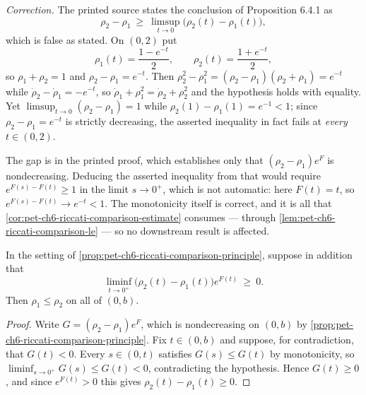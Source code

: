 \begin{remark}
  \label{rem:pet-ch6-riccati-principle-correction}
  \leanok
  \emph{Correction.} The printed source states the conclusion of
  Proposition 6.4.1 as
  \[
    \rho_2-\rho_1\ \ge\ \limsup_{t\to0}\big(\rho_2(t)-\rho_1(t)\big),
  \]
  which is false as stated. On $(0,2)$ put
  \[
    \rho_1(t)=\frac{1-e^{-t}}{2},\qquad \rho_2(t)=\frac{1+e^{-t}}{2},
  \]
  so $\rho_1+\rho_2=1$ and $\rho_2-\rho_1=e^{-t}$. Then
  $\rho_2^2-\rho_1^2=(\rho_2-\rho_1)(\rho_2+\rho_1)=e^{-t}$ while
  $\dot\rho_2-\dot\rho_1=-e^{-t}$, so $\dot\rho_1+\rho_1^2=\dot\rho_2+\rho_2^2$
  and the hypothesis holds with equality. Yet
  $\limsup_{t\to0}(\rho_2-\rho_1)=1$ while $\rho_2(1)-\rho_1(1)=e^{-1}<1$; since
  $\rho_2-\rho_1=e^{-t}$ is strictly decreasing, the asserted inequality in fact
  fails at \emph{every} $t\in(0,2)$.

  The gap is in the printed proof, which establishes only that
  $(\rho_2-\rho_1)e^{F}$ is nondecreasing. Deducing the asserted inequality from
  that would require $e^{F(s)-F(t)}\ge1$ in the limit $s\to0^+$, which is not
  automatic: here $F(t)=t$, so $e^{F(s)-F(t)}\to e^{-t}<1$. The monotonicity
  itself is correct, and it is all that
  \cref{cor:pet-ch6-riccati-comparison-estimate} consumes — through
  \cref{lem:pet-ch6-riccati-comparison-le} — so no downstream result is affected.
\end{remark}

\begin{lemma}
  \label{lem:pet-ch6-riccati-comparison-le}
  \leanok
  In the setting of \cref{prop:pet-ch6-riccati-comparison-principle}, suppose in
  addition that
  \[
    \liminf_{t\to0^+}\big(\rho_2(t)-\rho_1(t)\big)e^{F(t)}\ \ge\ 0 .
  \]
  Then $\rho_1\le\rho_2$ on all of $(0,b)$.
\end{lemma}
\begin{proof}
  \leanok
  Write $G=(\rho_2-\rho_1)e^{F}$, which is nondecreasing on $(0,b)$ by
  \cref{prop:pet-ch6-riccati-comparison-principle}. Fix $t\in(0,b)$ and suppose,
  for contradiction, that $G(t)<0$. Every $s\in(0,t)$ satisfies $G(s)\le G(t)$ by
  monotonicity, so $\liminf_{s\to0^+}G(s)\le G(t)<0$, contradicting the
  hypothesis. Hence $G(t)\ge0$, and since $e^{F(t)}>0$ this gives
  $\rho_2(t)-\rho_1(t)\ge0$.
\end{proof}

